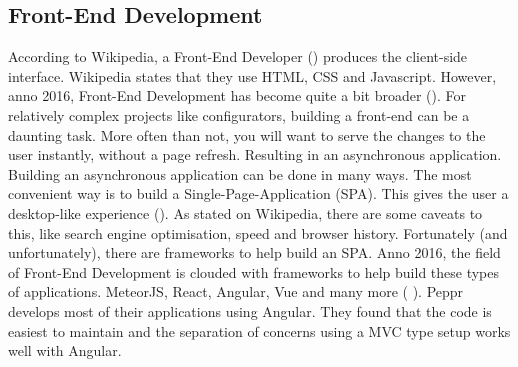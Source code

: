 \subsection{Front-End Development}
According to Wikipedia, a Front-End Developer (\citet{Front-End Developer Definition}) produces the client-side interface. Wikipedia states that they use HTML, CSS and Javascript. However, anno 2016, Front-End Development has become quite a bit broader (\citet{Javascript Anno 2016}). For relatively complex projects like configurators, building a front-end can be a daunting task. More often than not, you will want to serve the changes to the user instantly, without a page refresh. Resulting in an asynchronous application.
Building an asynchronous application can be done in many ways. The most convenient way is to build a Single-Page-Application (SPA). This gives the user a desktop-like experience (\citet{Single Page Applications}). As stated on Wikipedia, there are some caveats to this, like search engine optimisation, speed and browser history. Fortunately (and unfortunately), there are frameworks to help build an SPA. Anno 2016, the field of Front-End Development is clouded with frameworks to help build these types of applications. MeteorJS, React, Angular, Vue and many more (\citet{Front-End Javascript Frameworks} ).
Peppr develops most of their applications using Angular. They found that the code is easiest to maintain and the separation of concerns using a MVC type setup works well with Angular.

\newpage










